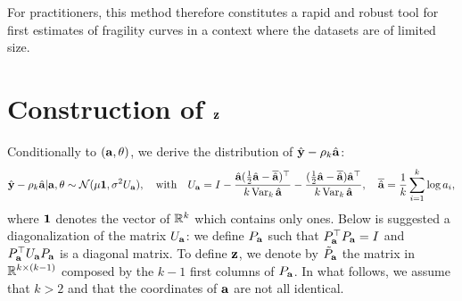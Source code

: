 For practitioners, this method therefore constitutes a rapid and robust tool for first estimates of fragility curves in a context where the datasets are of limited size.





\section{Construction of $\mathbf{z}$}\label{lowdoe:app:sec:DiagUa}


Conditionally to $(\mathbf{a}, \theta)$, we derive the distribution of $\hat{\mathbf{y}}-\rho_k\hat{\mathbf{a}}$: 
    \begin{equation}\label{lowdoe:eq:likelihood2}
        \hat{\mathbf{y}} - \rho_k\hat{\mathbf{a}}|\mathbf{a}, \theta \sim\mathcal{N}(\mu \mathbf{1}, \sigma^2 U_{\mathbf{a}})  , \quad\text{with}\quad U_{\mathbf{a}} = I - \frac{\hat{\mathbf{a}}(\frac{1}{2}\hat{\mathbf{a}} - \overline{\hat{\mathbf{a}}})^{\top}  }{k\operatorname{Var}_k\hat{\mathbf{a}}} - \frac{(\frac{1}{2}\hat{\mathbf{a}} - \overline{\hat{\mathbf{a}}}) \hat{\mathbf{a}}^{\top}  }{k\operatorname{Var}_k\hat{\mathbf{a}}} ,\quad \overline{\hat{\mathbf{a}}} = \frac{1}{k}\sum_{i=1}^k \log a_i,
    \end{equation}
where $\mathbf{1}$ denotes the vector of $\mathbb{R}^k$ which contains only ones. %
Below is suggested a diagonalization of the matrix $U_{\mathbf{a}}$: we define $P_{\mathbf{a}}$ such that $P_{\mathbf{a}}^{\top}P_{\mathbf{a}}=I$ and $P_{\mathbf{a}}^{\top}U_{\mathbf{a}}P_{\mathbf{a}}$ is a diagonal matrix. To define $\mathbf{z}$, we denote by $\tilde P_{\mathbf{a}}$ the matrix in $\mathbb{R}^{k\times(k-1)}$ composed by the $k-1$ first columns of $P_{\mathbf{a}}$. {In what follows, we assume that $k>2$ and that the coordinates of $\mathbf{a}$ are not all identical.} \\


